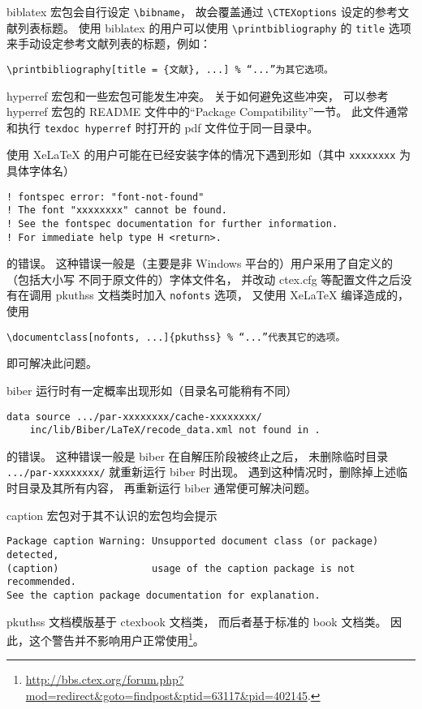 		biblatex 宏包\supercite{biblatex}会自行设定 \verb|\bibname|，
		故会覆盖通过 \verb|\CTEXoptions| 设定的参考文献列表标题。
		使用 biblatex 的用户可以使用 \verb|\printbibliography| 的
		\verb|title| 选项来手动设定参考文献列表的标题，例如：
\begin{Verbatim}[frame = single]
\printbibliography[title = {文献}, ...] % “...”为其它选项。
\end{Verbatim}

		hyperref 宏包\supercite{hyperref}和一些宏包可能发生冲突。
		关于如何避免这些冲突，
		可以参考 hyperref 宏包的 README 文件中的“Package Compatibility”一节。
		此文件通常和执行 \verb|texdoc hyperref| %
		时打开的 pdf 文件位于同一目录中。

		使用 Xe\LaTeX{} 的用户可能在已经安装字体的情况下遇到形如（其中
		\verb|xxxxxxxx| 为具体字体名）
\begin{Verbatim}[frame = single, fontsize = {\small}]
! fontspec error: "font-not-found"
! The font "xxxxxxxx" cannot be found.
! See the fontspec documentation for further information.
! For immediate help type H <return>.
\end{Verbatim}
		的错误。
		这种错误一般是（主要是非 Windows 平台的）用户采用了自定义的（包括大小写
		不同于原文件的）字体文件名，
		并改动 ctex.cfg 等配置文件之后没有在调用 pkuthss 文档类时加入
		\verb|nofonts| 选项，
		又使用 Xe\LaTeX{} 编译造成的，使用
\begin{Verbatim}[frame = single]
\documentclass[nofonts, ...]{pkuthss} % “...”代表其它的选项。
\end{Verbatim}
		即可解决此问题。

		biber 运行时有一定概率出现形如（目录名可能稍有不同）
\begin{Verbatim}[frame = single, fontsize = {\small}]
data source .../par-xxxxxxxx/cache-xxxxxxxx/
	inc/lib/Biber/LaTeX/recode_data.xml not found in .
\end{Verbatim}
		的错误。
		这种错误一般是 biber 在自解压阶段被终止之后，
		未删除临时目录 \verb|.../par-xxxxxxxx/| 就重新运行 biber 时出现。
		遇到这种情况时，删除掉上述临时目录及其所有内容，
		再重新运行 biber 通常便可解决问题。

		caption 宏包\supercite{caption}对于其不认识的宏包均会提示
\begin{Verbatim}[frame = single, fontsize = {\small}]
Package caption Warning: Unsupported document class (or package) detected,
(caption)                usage of the caption package is not recommended.
See the caption package documentation for explanation.
\end{Verbatim}
		pkuthss 文档模版基于 ctexbook 文档类，
		而后者基于标准的 book 文档类。
		因此，这个警告并不影响用户正常使用\footnote{%
			\url{http://bbs.ctex.org/forum.php?mod=redirect&goto=findpost&ptid=63117&pid=402145}.%
		}。


